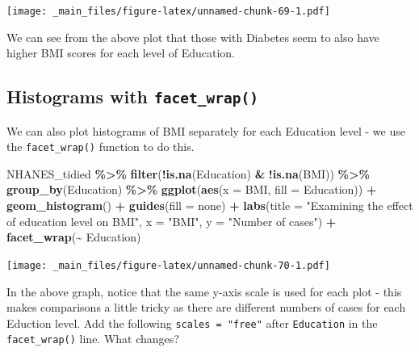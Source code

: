 \documentclass[
]{book}
\newenvironment{Shaded}{\begin{snugshade}}{\end{snugshade}}
\newcommand{\AttributeTok}[1]{\textcolor[rgb]{0.13,0.29,0.53}{#1}}
\newcommand{\FunctionTok}[1]{\textcolor[rgb]{0.13,0.29,0.53}{\textbf{#1}}}
\newcommand{\NormalTok}[1]{#1}
\newcommand{\SpecialCharTok}[1]{\textcolor[rgb]{0.81,0.36,0.00}{\textbf{#1}}}
\newcommand{\StringTok}[1]{\textcolor[rgb]{0.31,0.60,0.02}{#1}}
\begin{document}
\texttt{[image: \_main\_files/figure-latex/unnamed-chunk-69-1.pdf]}

We can see from the above plot that those with Diabetes seem to also have higher BMI scores for each level of Education.

\hypertarget{histograms-with-facet_wrap}{%
\subsection{\texorpdfstring{Histograms with \texttt{facet\_wrap()}}{Histograms with facet\_wrap()}}\label{histograms-with-facet_wrap}}

We can also plot histograms of BMI separately for each Education level - we use the \texttt{facet\_wrap()} function to do this.

\begin{Shaded}
\begin{Highlighting}[]
\NormalTok{NHANES\_tidied }\SpecialCharTok{\%\textgreater{}\%} 
  \FunctionTok{filter}\NormalTok{(}\SpecialCharTok{!}\FunctionTok{is.na}\NormalTok{(Education) }\SpecialCharTok{\&} \SpecialCharTok{!}\FunctionTok{is.na}\NormalTok{(BMI)) }\SpecialCharTok{\%\textgreater{}\%}
  \FunctionTok{group\_by}\NormalTok{(Education) }\SpecialCharTok{\%\textgreater{}\%} 
  \FunctionTok{ggplot}\NormalTok{(}\FunctionTok{aes}\NormalTok{(}\AttributeTok{x =}\NormalTok{ BMI, }\AttributeTok{fill =}\NormalTok{ Education)) }\SpecialCharTok{+}
  \FunctionTok{geom\_histogram}\NormalTok{() }\SpecialCharTok{+}
  \FunctionTok{guides}\NormalTok{(}\AttributeTok{fill =} \StringTok{\textquotesingle{}none\textquotesingle{}}\NormalTok{) }\SpecialCharTok{+} 
  \FunctionTok{labs}\NormalTok{(}\AttributeTok{title =} \StringTok{"Examining the effect of education level on BMI"}\NormalTok{,}
       \AttributeTok{x =} \StringTok{"BMI"}\NormalTok{, }
       \AttributeTok{y =} \StringTok{"Number of cases"}\NormalTok{) }\SpecialCharTok{+} 
  \FunctionTok{facet\_wrap}\NormalTok{(}\SpecialCharTok{\textasciitilde{}}\NormalTok{ Education)}
\end{Highlighting}
\end{Shaded}

\texttt{[image: \_main\_files/figure-latex/unnamed-chunk-70-1.pdf]}

In the above graph, notice that the same y-axis scale is used for each plot - this makes comparisons a little tricky as there are different numbers of cases for each Eduction level. Add the following \texttt{scales\ =\ "free"} after \texttt{Education} in the \texttt{facet\_wrap()} line. What changes?
\end{document}
